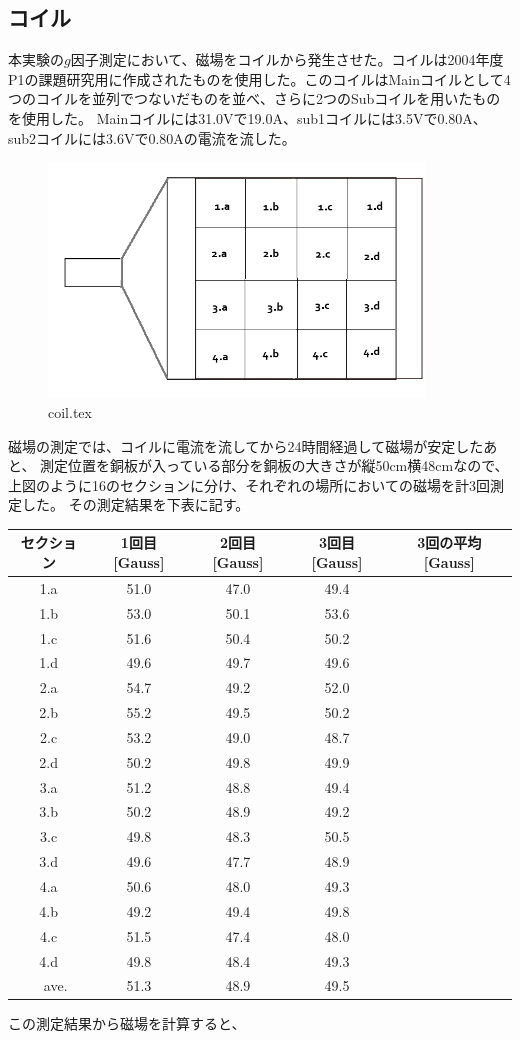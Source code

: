 \subsection{コイル}
  本実験の\(g\)因子測定において、磁場をコイルから発生させた。コイルは2004年度P1の課題研究用に作成されたものを使用した。このコイルはMainコイルとして4つのコイルを並列でつないだものを並べ、さらに2つのSubコイルを用いたものを使用した。
Mainコイルには31.0Vで19.0A、sub1コイルには3.5Vで0.80A、sub2コイルには3.6Vで0.80Aの電流を流した。
\begin{figure}[htbp]
 \begin{center}
  \includegraphics[width=100mm,bb=0 0 640 400]{coil.jpg}
  \caption{coil.tex}
 \end{center}
\end{figure}
磁場の測定では、コイルに電流を流してから24時間経過して磁場が安定したあと、
測定位置を銅板が入っている部分を銅板の大きさが縦50cm横48cmなので、上図のように16のセクションに分け、それぞれの場所においての磁場を計3回測定した。
その測定結果を下表に記す。
\begin{center}
\begin{tabular}{c|ccc|c}\hline
  セクション&1回目[Gauss]&2回目[Gauss]&3回目[Gauss]&3回の平均[Gauss]\\ \hline
  1.a & 51.0 & 47.0 & 49.4 & \\
  1.b & 53.0 & 50.1 & 53.6 & \\
  1.c & 51.6 & 50.4 & 50.2 & \\
  1.d & 49.6 & 49.7 & 49.6 & \\
  2.a & 54.7 & 49.2 & 52.0 & \\
  2.b & 55.2 & 49.5 & 50.2 & \\
  2.c & 53.2 & 49.0 & 48.7 & \\
  2.d & 50.2 & 49.8 & 49.9 & \\
  3.a & 51.2 & 48.8 & 49.4 & \\
  3.b & 50.2 & 48.9 & 49.2 & \\
  3.c & 49.8 & 48.3 & 50.5 & \\
  3.d & 49.6 & 47.7 & 48.9 & \\
  4.a & 50.6 & 48.0 & 49.3 & \\
  4.b & 49.2 & 49.4 & 49.8 & \\
  4.c & 51.5 & 47.4 & 48.0 & \\
  4.d & 49.8 & 48.4 & 49.3 & \\
　ave.& 51.3 & 48.9 & 49.5 & \\
\end{tabular}
\end{center}
この測定結果から磁場を計算すると、


